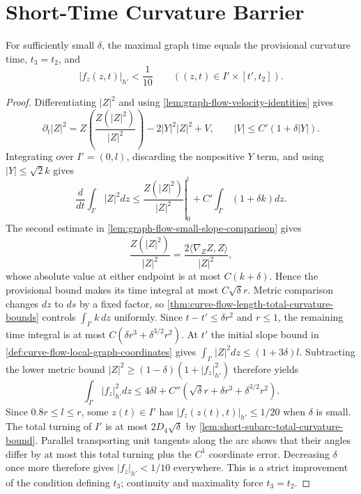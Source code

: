 \section{Short-Time Curvature Barrier}

\begin{theorem}
\label{lem:graph-slope-persistence}
\notready
For sufficiently small $\delta$, the maximal graph time equals the
provisional curvature time, $t_3=t_2$, and
\[
 |f_z(z,t)|_{h'}<\frac1{10}
 \qquad((z,t)\in I'\times[t',t_2]).
\]
\end{theorem}
\begin{proof}
Differentiating $|Z|^2$ and using
\ref{lem:graph-flow-velocity-identities} gives
\[
 \partial_t|Z|^2
 =Z\left(\frac{Z(|Z|^2)}{|Z|^2}\right)-2|Y|^2|Z|^2+V,
 \qquad |V|\le C'(1+\delta|Y|).
\]
Integrating over $I'=(0,l)$, discarding the nonpositive $Y$ term, and using
$|Y|\le\sqrt2k$ gives
\[
 \frac d{dt}\int_{I'}|Z|^2dz
 \le \left.\frac{Z(|Z|^2)}{|Z|^2}\right|_0^l
      +C'\int_{I'}(1+\delta k)dz.
\]
The second estimate in \ref{lem:graph-flow-small-slope-comparison} gives
\[
 \frac{Z(|Z|^2)}{|Z|^2}
 =\frac{2\langle\nabla_ZZ,Z\rangle}{|Z|^2},
\]
whose absolute value at either endpoint is at most $C(k+\delta)$.  Hence the
provisional bound makes its time integral at most
$C\sqrt\delta r$.  Metric comparison changes $dz$ to $ds$ by a fixed factor,
so \ref{thm:curve-flow-length-total-curvature-bounds} controls
$\int_{I'}k\,dz$ uniformly.  Since $t-t'\le\delta r^2$ and $r\le1$, the
remaining time integral is at most $C(\delta r^3+\delta^{3/2}r^2)$.
At $t'$ the initial slope bound in
\ref{def:curve-flow-local-graph-coordinates} gives
$\int_{I'}|Z|^2dz\le(1+3\delta)l$.  Subtracting the lower metric bound
$|Z|^2\ge(1-\delta)(1+|f_z|_{h'}^2)$ therefore yields
\[
 \int_{I'}|f_z|_{h'}^2dz
 \le4\delta l+C''(\sqrt\delta r+\delta r^3+\delta^{3/2}r^2).
\]
Since $0.8r\le l\le r$, some $z(t)\in I'$ has
$|f_z(z(t),t)|_{h'}\le1/20$ when $\delta$ is small.  The total turning of
$I'$ is at most $2D_4\sqrt\delta$ by
\ref{lem:short-subarc-total-curvature-bound}.  Parallel
transporting unit tangents along the arc shows that their angles differ by
at most this total turning plus the $C^1$ coordinate error.  Decreasing
$\delta$ once more therefore gives $|f_z|_{h'}<1/10$ everywhere.  This is a
strict improvement of the condition defining $t_3$; continuity and
maximality force $t_3=t_2$.
\end{proof}

